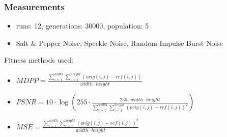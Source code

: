 \documentclass{beamer}
\begin{document}
	\begin{frame}[t,fragile]
		\frametitle{Measurements}
		
		\begin{itemize}		
			\item runs: 12, generations: 30000, population: 5
			\item Salt \& Pepper Noise, Speckle Noise, Random Impulse Burst Noise
		\end{itemize}		 
		
		Fitness methods used:
		
		\begin{itemize}
		\item
		$ MDPP = \frac{\sum_{i=1}^{width} \sum_{i=1}^{height} (orig(i,j) - ref(i,j))}{width \cdot height}$
		\item
		$ PSNR = 10 \cdot \log(255 \cdot \frac{255 \cdot width \cdot height}{\sum_{i=1}^{width} \sum_{i=1}^{height} (orig(i,j) - ref(i,j))^2})$
		\item
		$ MSE = \frac{\sum_{i=1}^{width} \sum_{i=1}^{height} (orig(i,j) - ref(i,j))^2}{width \cdot height}$
		\end{itemize}
		

	\end{frame}
	
\end{document}
